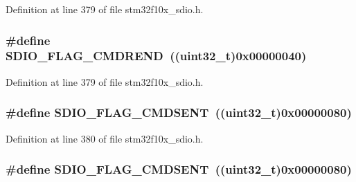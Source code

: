 Definition at line 379 of file stm32f10x\+\_\+sdio.\+h.

\subsubsection[{\texorpdfstring{S\+D\+I\+O\+\_\+\+F\+L\+A\+G\+\_\+\+C\+M\+D\+R\+E\+ND}{SDIO_FLAG_CMDREND}}]{\setlength{\rightskip}{0pt plus 5cm}\#define S\+D\+I\+O\+\_\+\+F\+L\+A\+G\+\_\+\+C\+M\+D\+R\+E\+ND~(({\bf uint32\+\_\+t})0x00000040)}\hypertarget{group___s_d_i_o___flags_ga083531db75a1e4c05c47578763d53af1}{}\label{group___s_d_i_o___flags_ga083531db75a1e4c05c47578763d53af1}


Definition at line 379 of file stm32f10x\+\_\+sdio.\+h.

\subsubsection[{\texorpdfstring{S\+D\+I\+O\+\_\+\+F\+L\+A\+G\+\_\+\+C\+M\+D\+S\+E\+NT}{SDIO_FLAG_CMDSENT}}]{\setlength{\rightskip}{0pt plus 5cm}\#define S\+D\+I\+O\+\_\+\+F\+L\+A\+G\+\_\+\+C\+M\+D\+S\+E\+NT~(({\bf uint32\+\_\+t})0x00000080)}\hypertarget{group___s_d_i_o___flags_gac81f3837aac17a6aed7310a8ea460f17}{}\label{group___s_d_i_o___flags_gac81f3837aac17a6aed7310a8ea460f17}


Definition at line 380 of file stm32f10x\+\_\+sdio.\+h.

\subsubsection[{\texorpdfstring{S\+D\+I\+O\+\_\+\+F\+L\+A\+G\+\_\+\+C\+M\+D\+S\+E\+NT}{SDIO_FLAG_CMDSENT}}]{\setlength{\rightskip}{0pt plus 5cm}\#define S\+D\+I\+O\+\_\+\+F\+L\+A\+G\+\_\+\+C\+M\+D\+S\+E\+NT~(({\bf uint32\+\_\+t})0x00000080)}\hypertarget{group___s_d_i_o___flags_gac81f3837aac17a6aed7310a8ea460f17}{}\label{group___s_d_i_o___flags_gac81f3837aac17a6aed7310a8ea460f17}


